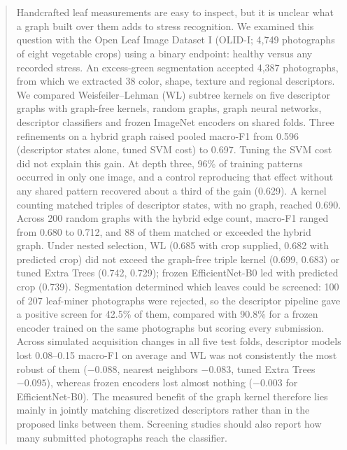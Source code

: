 \begin{abstract}
\section{}
Handcrafted leaf measurements are easy to inspect, but it is unclear what a graph built over them adds to stress recognition. We examined this question with the Open Leaf Image Dataset I (OLID-I; 4,749 photographs of eight vegetable crops) using a binary endpoint: healthy versus any recorded stress. An excess-green segmentation accepted 4,387 photographs, from which we extracted 38 color, shape, texture and regional descriptors. We compared Weisfeiler--Lehman (WL) subtree kernels on five descriptor graphs with graph-free kernels, random graphs, graph neural networks, descriptor classifiers and frozen ImageNet encoders on shared folds. Three refinements on a hybrid graph raised pooled macro-F1 from 0.596 (descriptor states alone, tuned SVM cost) to 0.697. Tuning the SVM cost did not explain this gain. At depth three, 96\% of training patterns occurred in only one image, and a control reproducing that effect without any shared pattern recovered about a third of the gain (0.629). A kernel counting matched triples of descriptor states, with no graph, reached 0.690. Across 200 random graphs with the hybrid edge count, macro-F1 ranged from 0.680 to 0.712, and 88 of them matched or exceeded the hybrid graph. Under nested selection, WL (0.685 with crop supplied, 0.682 with predicted crop) did not exceed the graph-free triple kernel (0.699, 0.683) or tuned Extra Trees (0.742, 0.729); frozen EfficientNet-B0 led with predicted crop (0.739). Segmentation determined which leaves could be screened: 100 of 207 leaf-miner photographs were rejected, so the descriptor pipeline gave a positive screen for 42.5\% of them, compared with 90.8\% for a frozen encoder trained on the same photographs but scoring every submission. Across simulated acquisition changes in all five test folds, descriptor models lost 0.08--0.15 macro-F1 on average and WL was not consistently the most robust of them ($-0.088$, nearest neighbors $-0.083$, tuned Extra Trees $-0.095$), whereas frozen encoders lost almost nothing ($-0.003$ for EfficientNet-B0). The measured benefit of the graph kernel therefore lies mainly in jointly matching discretized descriptors rather than in the proposed links between them. Screening studies should also report how many submitted photographs reach the classifier.

\tiny{}
\end{abstract}

